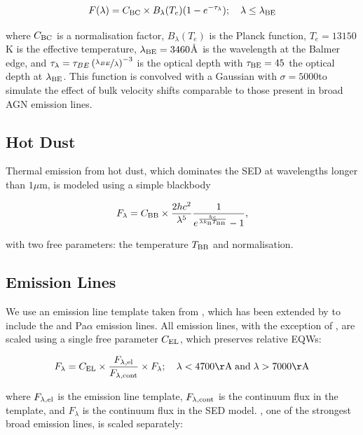 \begin{equation}
  F(\lambda) = C_{\rm BC} \times B_\lambda(T_e)(1-e^{-\tau_\lambda}); \quad \lambda \leq \lambda_{\rm BE}
\end{equation}

where $C_{\rm BC}$ is a normalisation factor, $B_\lambda(T_e)$ is the Planck function, $T_e=13150$K is the effective temperature, $\lambda_{\rm BE}=3460$\AA\, is the wavelength at the Balmer edge, and $\tau_\lambda = \tau_{BE}\left( \nicefrac{\lambda_{BE}} {\lambda} \right)^{-3}$ is the optical depth with $\tau_{\rm BE}=45$ the optical depth at $\lambda_{\rm BE}$. 
This function is convolved with a Gaussian with $\sigma=5000$\kms to simulate the effect of bulk velocity shifts comparable to those present in broad \ac{AGN} emission lines. 

\subsection{Hot Dust}

Thermal emission from hot dust, which dominates the \ac{SED} at wavelengths longer than $1\mu$m, is modeled using a simple blackbody

\begin{eqnarray}  
  F_\lambda = C_{\rm BB} \times \frac{2 hc^2}{\lambda^5}\frac{1}{ e^{\frac{hc}{\lambda k_\mathrm{B}T_{\rm BB}}} - 1}, 
\end{eqnarray}

with two free parameters: the temperature $T_{\rm BB}$ and normalisation. 

\subsection{Emission Lines}

We use an emission line template taken from \citet{francis91}, which has been extended by \citet{maddox06} to include the \hans and Pa$\alpha$ emission lines. 
All emission lines, with the exception of \hans, are scaled using a single free parameter $C_{\rm EL}$, which preserves relative \ac{EQW}s:

\begin{eqnarray}
  F_{\lambda} =  C_{\rm EL} \times \frac{F_{\lambda, \rm el}}{F_{\lambda, \rm cont}} \times F_{\lambda} ; \quad \lambda < 4700{\rm \AA} \;{\rm and}\; \lambda > 7000{\rm \AA} 
\end{eqnarray} 

where $F_{\lambda, \rm el}$ is the emission line template, $F_{\lambda,\rm cont}$ is the continuum flux in the template, and $F_{\lambda}$ is the continuum flux in the \ac{SED} model.  
\hans, one of the strongest broad emission lines, is scaled separately: 

